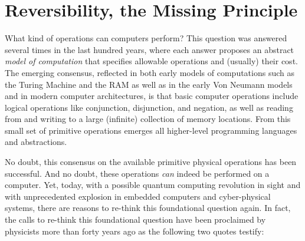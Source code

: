 \documentclass{article}
\begin{document}








\section{Reversibility, the Missing Principle}

What kind of operations can computers perform? This question was
answered several times in the last hundred years, where each answer
proposes an abstract \emph{model of computation} that specifies
allowable operations and (usually) their cost. The emerging consensus,
reflected in both early models of computations such as the Turing
Machine and the RAM as well as in the early Von Neumann models and in
modern computer architectures, is that basic computer operations
include logical operations like conjunction, disjunction, and
negation, as well as reading from and writing to a large (infinite)
collection of memory locations. From this small set of primitive
operations emerges all higher-level programming languages and
abstractions.

No doubt, this consensus on the available primitive physical
operations has been successful. And no doubt, these operations
\emph{can} indeed be performed on a computer. Yet, today, with a
possible quantum computing revolution in sight and with unprecedented
explosion in embedded computers and cyber-physical systems, there are
reasons to re-think this foundational question again. In fact, the
calls to re-think this foundational question have been proclaimed by
physicists more than forty years ago as the following two quotes
testify:
\end{document}
